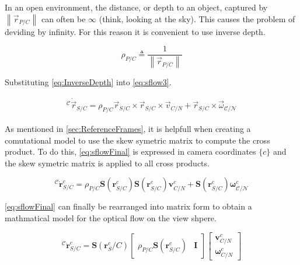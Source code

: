 \documentclass{UoNMCHA}
\newcommand{\norm}[1]{\left\lVert#1\right\rVert}
\numberwithin{equation}{section}
\begin{document}
In an open environment, the distance, or depth to an object, captured by $\norm{\vec{r}_{P/C}}$ can often be $\infty$ (think, looking at the sky). This causes the problem of deviding by infinity. For this reason it is convenient to use inverse depth.

\begin{equation}\label{eq:InverseDepth}
	\rho_{P/C} \triangleq \frac{1}{\norm{\vec{r}_{P/C}}}
\end{equation}

Substituting \cref{eq:InverseDepth} into \cref{eq:sflow3}.

\begin{equation}\label{eq:sflow4}
	\begin{split}
		{}^\mathcal{C}\dot{\vec{r}}_{S/C} = \rho_{P/C}\vec{r}_{S/C}\times\vec{r}_{S/C}\times\vec{v}_{C/N} + \vec{r}_{S/C}\times\vec{\omega}_{\mathcal{C}/\mathcal{N}}
	\end{split}
\end{equation}

As mentioned in \cref{sec:ReferenceFrames}, it is helpfull when creating a comutational model to use the skew symetric matrix to compute the cross product. To do this, \cref{eq:sflowFinal} is expressed in camera coordinates $\{c\}$ and the skew symetric matrix is applied to all cross products.

\begin{equation}\label{eq:sflowFinal}
	{}^\mathcal{C}\dot{\mathbf{r}}^{c}_{S/C} = \rho_{P/C}\mathbf{S}(\mathbf{r}^{c}_{S/C}) \mathbf{S}(\mathbf{r}^{c}_{S/C}) \mathbf{v}^{c}_{C/N} + \mathbf{S}(\mathbf{r}^{c}_{S/C})\mathbf{\omega}^{c}_{\mathcal{C}/\mathcal{N}}
\end{equation}

\cref{eq:sflowFinal} can finally be rearranged into matrix form to obtain a mathmatical model for the optical flow on the view shpere.

\begin{equation}\label{eq:SphericalFlow}
	{}^\mathcal{C}\dot{\mathbf{r}}^{c}_{S/C} = \mathbf{S}(\mathbf{r}^{c}_S/C)
	\begin{bmatrix}
		\rho_{P/C} \mathbf{S}(\mathbf{r}^{c}_{S/C}) & \mathbf{I}
	\end{bmatrix}
	\begin{bmatrix}
		\mathbf{v}^{c}_{C/N}\\
		\mathbf{\omega}^{c}_{C/N}
	\end{bmatrix}
\end{equation}
\end{document}
